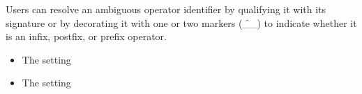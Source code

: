 
Users can resolve an ambiguous operator identifier by qualifying it with its
signature or by decorating it with one or two markers (\f{__}) to indicate
whether it is an infix, postfix, or prefix operator.


\begin{itemize}
\item The  setting
\item The  setting
\end{itemize}

